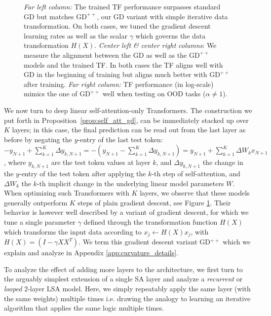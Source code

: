 \documentclass{article}
\theoremstyle{plain}
\theoremstyle{definition}
\theoremstyle{remark}
\begin{document}
\begin{figure}
\begin{center}
\begin{minipage}{.24\textwidth}
\begin{center}
  \end{center}
\end{minipage}
\end{center}
\vspace{-10pt}
  \caption{\textit{Far left column:}  The trained TF performance surpasses standard  $\text{GD}$ but matches $\text{GD}^{++}$, our GD variant with simple iterative data transformation. On both cases, we tuned the gradient descent learning rates as well as the scalar $\gamma$ which governs the data transformation $H(X)$.
  \textit{Center left \& center right columns}: We measure the alignment between the GD as well as the $\text{GD}^{++}$ models and the trained TF. In both cases the TF aligns well with GD in the beginning of training but aligns much better with $\text{GD}^{++}$ after training. \textit{Far right column:} TF performance (in log-scale) mimics the one of $\text{GD}^{++}$ well when testing on OOD tasks ($\alpha \neq 1$).}
  \label{fig:multi_layer}
   \vspace{-10pt}
\end{figure}

We now turn to deep linear self-attention-only Transformers. The construction we put forth in Proposition~\ref{prop:self_att_gd}, can be immediately stacked up over $K$ layers; in this case, the final prediction can be read out from the last layer as before by negating the $y$-entry of the last test token: $-y_{N+1} + \sum_{k=1}^K \Delta y_{k,N+1}= - (y_{N+1} - \sum_{k=1}^K \Delta y_{k,N+1}) = y_{N+1} + \sum_{k=1}^K \Delta W_k x_{N+1}$, where $y_{k,N+1}$ are the test token values at layer $k$, and $\Delta y_{k,N+1}$ the change in the $y$-entry of the test token after applying the $k$-th step of self-attention, and $\Delta W_k$ the $k$-th implicit change in the underlying linear model parameters $W$. When optimizing such Transformers with $K$ layers, we observe that these models generally outperform $K$ steps of plain gradient descent, see Figure \ref{fig:multi_layer}. Their behavior is however well described by a variant of gradient descent, for which we tune a single parameter $\gamma$ defined through  the transformation function $H(X)$ which transforms the input data according to $x_j \leftarrow H(X) x_j$, with $H(X) = (I - \gamma XX^T)$. We term this gradient descent variant GD$^{++}$ which we explain and analyze in Appendix \ref{app:curvature_details}.

To analyze the effect of adding more layers to the architecture, we first turn to the arguably simplest extension of a single SA layer and analyze a \textit{recurrent} or \textit{looped} 2-layer LSA model. Here, we simply repeatably apply the same layer (with the same weights) multiple times i.e. drawing the analogy to learning an iterative algorithm that applies the same logic multiple times. 
\end{document}
